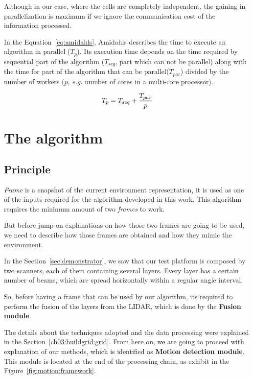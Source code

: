 Although in our case, where the cells are completely independent, the gaining in parallelization is maximum if we ignore the communication cost of the information processed.

In the Equation~\ref{eq:amidahls}, Amidahls describes the time to execute an algorithm in parallel ($T_p$). Its execution time depends on the time required by sequential part of the algorithm ($T_{seq}$, part which can not be parallel) along with the time for part of the algorithm that can be parallel($T_{par}$) divided by the number of workers ($p$, \textit{e.g.} number of cores in a multi-core processor).

\begin{equation}
\label{eq:amidahls}
T_p=T_{seq}+{T_{par} \over p}
\end{equation}

\section{The algorithm}

\subsection{Principle} 

\textit{Frame} is a snapshot of the current environment representation, it is used as one of the inputs required for the algorithm developed in this work. This algorithm requires the minimum amount of two \textit{frames} to work. 

But before jump on explanations on how those two frames are going to be used, we need to describe how those frames are obtained and how they mimic the environment.

In the Section~\ref{sec:demonstrator}, we saw that our test platform is composed by two scanners, each of them containing several layers. Every layer has a certain number of beams, which are spread horizontally within a regular angle interval. 

So, before having a frame that can be used by our algorithm, its required to perform the fusion of the layers from the LIDAR, which is done by the \textbf{Fusion module}. 

The details about the techniques adopted and the data processing were explained in the Section~\ref{ch03:buildgrid:grid}. From here on, we are going to proceed with explanation of our methods, which is identified as \textbf{Motion detection module}. This module is located at the end of the processing chain, as exhibit in the Figure~\ref{fig:motion:framework}. 

